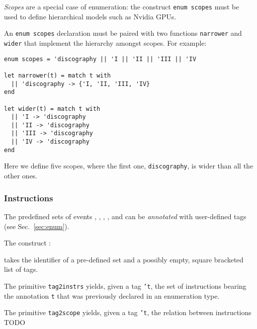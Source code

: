 \emph{Scopes} are a special case of enumeration: the construct {\tt enum
scopes} must be used to define hierarchical models such as Nvidia GPUs.

An {\tt enum scopes} declaration must be paired with two functions {\tt narrower} and {\tt wider} that implement the hierarchy amongst scopes. For example:

\begin{verbatim}
enum scopes = 'discography || 'I || 'II || 'III || 'IV

let narrower(t) = match t with
  || 'discography -> {'I, 'II, 'III, 'IV}
end

let wider(t) = match t with
  || 'I -> 'discography
  || 'II -> 'discography
  || 'III -> 'discography
  || 'IV -> 'discography
end
\end{verbatim}

Here we define five scopes, where the first one, {\tt discography}, is wider
than all the other ones.

\subsubsection*{Instructions}
The predefined sets of events , , ,
, and  can be \emph{annotated} with user-defined tags
(see Sec.~\ref{sec:enum}).

The construct :

\begin{center}
\T{[}  \T{]}
\end{center}

takes the identifier of a pre-defined set and a possibly empty, square bracketed
list of tags.

The primitive {\tt tag2instrs} yields, given a tag {\tt 't}, the set of
instructions bearing the annotation {\tt t} that was previously declared in an
enumeration type.

The primitive {\tt tag2scope} yields, given a tag {\tt 't}, the relation
between instructions TODO

